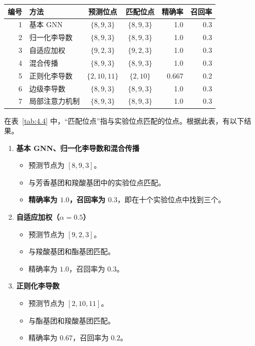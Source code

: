 \begin{table}[htbp]
  \centering\small
  \begin{tabularx}{\linewidth}{@{}r X c c r r@{}}
    \toprule
    编号 & 方法 & 预测位点 & 匹配位点 & 精确率 & 召回率 \\
    \midrule
    1 & 基本 GNN         & $\{8,9,3\}$   & $\{8,9,3\}$ & 1.0   & 0.3 \\
    2 & 归一化李导数     & $\{8,9,3\}$   & $\{8,9,3\}$ & 1.0   & 0.3 \\
    3 & 自适应加权       & $\{9,2,3\}$   & $\{9,2,3\}$ & 1.0   & 0.3 \\
    4 & 混合传播         & $\{8,9,3\}$   & $\{8,9,3\}$ & 1.0   & 0.3 \\
    5 & 正则化李导数     & $\{2,10,11\}$ & $\{2,10\}$  & 0.667 & 0.2 \\
    6 & 边级李导数       & $\{8,9,3\}$   & $\{8,9,3\}$ & 1.0   & 0.3 \\
    7 & 局部注意力机制   & $\{8,9,3\}$   & $\{8,9,3\}$ & 1.0   & 0.3 \\
    \bottomrule
  \end{tabularx}
\end{table}

在表~\ref{tab:4.4} 中，“匹配位点”指与实验位点匹配的位点。根据此表，有以下结果。
\begin{enumerate}
  \item \textbf{基本 GNN、归一化李导数和混合传播}
  \begin{itemize}
    \item 预测节点为 $[8,9,3]$。
    \item 与芳香基团和羧酸基团中的实验位点匹配。
    \item \textbf{精确率为 $1.0$，召回率为 $0.3$}，即在十个实验位点中找到三个。
  \end{itemize}
  \item \textbf{自适应加权（$\alpha=0.5$）}
  \begin{itemize}
    \item 预测节点为 $[9,2,3]$。
    \item 与羧酸基团和酯基团匹配。
    \item 精确率为 $1.0$，召回率为 $0.3$。
  \end{itemize}
  \item \textbf{正则化李导数}
  \begin{itemize}
    \item 预测节点为 $[2,10,11]$。
    \item 与酯基团和羧酸基团匹配。
    \item 精确率为 $0.67$，召回率为 $0.2$。
  \end{itemize}
\end{enumerate}

